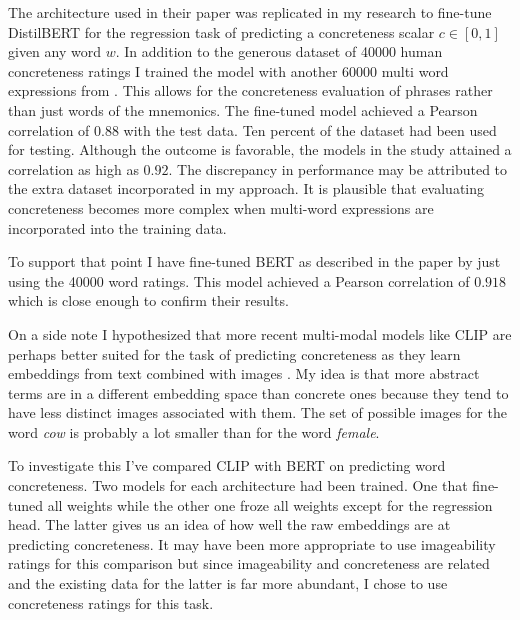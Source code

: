 The architecture used in their paper was replicated in my research to fine-tune DistilBERT for the regression task of predicting a concreteness scalar $c \in [0,1]$ given any word $w$. In addition to the generous dataset of 40000 human concreteness ratings \cite{40000_concr} I trained the model with another 60000 multi word expressions from \cite{60000_concr}. This allows for the concreteness evaluation of phrases rather than just words of the mnemonics. The fine-tuned model achieved a Pearson correlation of $0.88$ with the test data. Ten percent of the dataset had been used for testing. Although the outcome is favorable, the models in the study attained a correlation as high as $0.92$. The discrepancy in performance may be attributed to the extra dataset incorporated in my approach. It is plausible that evaluating concreteness becomes more complex when multi-word expressions are incorporated into the training data.

To support that point I have fine-tuned BERT as described in the paper by just using the 40000 word ratings. This model achieved a Pearson correlation of $0.918$ which is close enough to confirm their results.

On a side note I hypothesized that more recent multi-modal models like CLIP are perhaps better suited for the task of predicting concreteness as they learn embeddings from text combined with images \cite{clip_openai}. My idea is that more abstract terms are in a different embedding space than concrete ones because they tend to have less distinct images associated with them. The set of possible images for the word \emph{cow} is probably a lot smaller than for the word \emph{female}.

To investigate this I've compared CLIP with BERT on predicting word concreteness. Two models for each architecture had been trained. One that fine-tuned all weights while the other one froze all weights except for the regression head. The latter gives us an idea of how well the raw embeddings are at predicting concreteness. It may have been more appropriate to use imageability ratings for this comparison but since imageability and concreteness are related and the existing data for the latter is far more abundant, I chose to use concreteness ratings for this task. 

